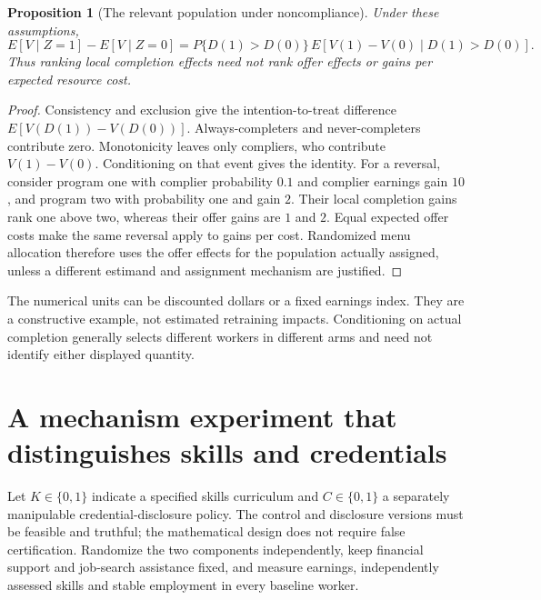 \documentclass[11pt]{article}
\newtheorem{proposition}[theorem]{Proposition}
\theoremstyle{remark}
\begin{document}
\begin{proposition}[The relevant population under noncompliance]
Under these assumptions,
\[
 E[V\mid Z=1]-E[V\mid Z=0]
 =P\{D(1)>D(0)\}\,E[V(1)-V(0)\mid D(1)>D(0)].
\]
Thus ranking local completion effects need not rank offer effects or gains per expected resource cost.
\end{proposition}
\begin{proof}
Consistency and exclusion give the intention-to-treat difference
$E[V(D(1))-V(D(0))]$. Always-completers and never-completers contribute zero. Monotonicity leaves only compliers, who contribute $V(1)-V(0)$. Conditioning on that event gives the identity. For a reversal, consider program one with complier probability $0.1$ and complier earnings gain $10$, and program two with probability one and gain $2$. Their local completion gains rank one above two, whereas their offer gains are $1$ and $2$. Equal expected offer costs make the same reversal apply to gains per cost. Randomized menu allocation therefore uses the offer effects for the population actually assigned, unless a different estimand and assignment mechanism are justified.
\end{proof}
The numerical units can be discounted dollars or a fixed earnings index. They are a constructive example, not estimated retraining impacts. Conditioning on actual completion generally selects different workers in different arms and need not identify either displayed quantity.

\section*{A mechanism experiment that distinguishes skills and credentials}
Let $K\in\{0,1\}$ indicate a specified skills curriculum and $C\in\{0,1\}$ a separately manipulable credential-disclosure policy. The control and disclosure versions must be feasible and truthful; the mathematical design does not require false certification. Randomize the two components independently, keep financial support and job-search assistance fixed, and measure earnings, independently assessed skills and stable employment in every baseline worker.
\end{document}

